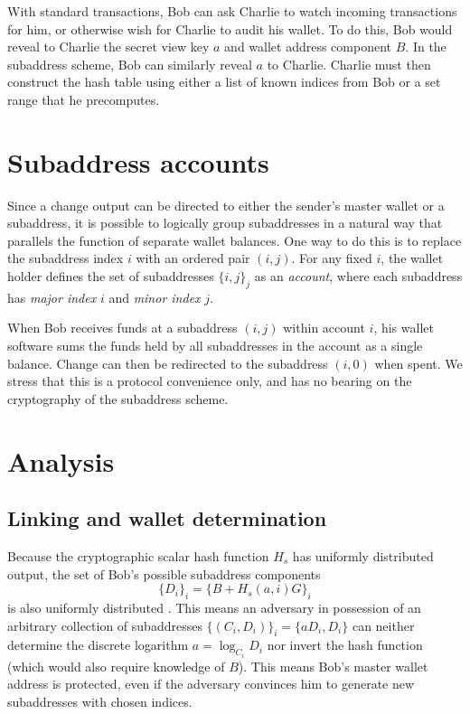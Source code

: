 \documentclass{mrl}
\begin{document}
With standard transactions, Bob can ask Charlie to watch incoming transactions for him, or otherwise wish for Charlie to audit his wallet. To do this, Bob would reveal to Charlie the secret view key $a$ and wallet address component $B$. In the subaddress scheme, Bob can similarly reveal $a$ to Charlie. Charlie must then construct the hash table using either a list of known indices from Bob or a set range that he precomputes.


\section{Subaddress accounts}
Since a change output can be directed to either the sender's master wallet or a subaddress, it is possible to logically group subaddresses in a natural way that parallels the function of separate wallet balances. One way to do this is to replace the subaddress index $i$ with an ordered pair $(i,j)$. For any fixed $i$, the wallet holder defines the set of subaddresses $\{i,j\}_j$ as an \textit{account}, where each subaddress has \textit{major index} $i$ and \textit{minor index} $j$.

When Bob receives funds at a subaddress $(i,j)$ within account $i$, his wallet software sums the funds held by all subaddresses in the account as a single balance. Change can then be redirected to the subaddress $(i,0)$ when spent. We stress that this is a protocol convenience only, and has no bearing on the cryptography of the subaddress scheme.


\section{Analysis}
\subsection{Linking and wallet determination}
Because the cryptographic scalar hash function $H_s$ has uniformly distributed output, the set of Bob's possible subaddress components $$\{D_i\}_i = \{B + H_s(a,i)G\}_i$$ is also uniformly distributed \cite{uniform}. This means an adversary in possession of an arbitrary collection of subaddresses $\{(C_i,D_i)\}_i = \{aD_i,D_i\}$ can neither determine the discrete logarithm $a = \log_{C_i} D_i$ nor invert the hash function (which would also require knowledge of $B$). This means Bob's master wallet address is protected, even if the adversary convinces him to generate new subaddresses with chosen indices.
\end{document}
